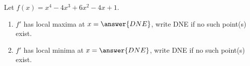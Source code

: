 \documentclass{ximera}
\author{Gregory Hartman \and Matthew Carr}
\begin{document}
\begin{exercise}






Let $f(x)=x^4-4x^3+6x^2-4x+1$.
\begin{enumerate}
\item		$f'$ has local maxima at $x=\answer{DNE}$, write DNE if no such point(s) exist.
\item		$f'$ has local minima at $x=\answer{DNE}$, write DNE if no such point(s) exist.
\end{enumerate}

\end{exercise}
\end{document}
